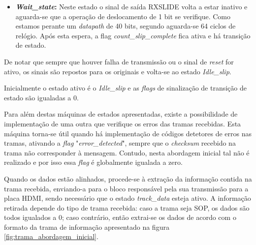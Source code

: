 \begin{enumerate}
\begin{itemize}
		\item \textbf{\textit{Wait\_state}:} Neste estado o sinal de saída RXSLIDE volta a estar inativo e aguarda-se que a operação de deslocamento de 1 bit se verifique. Como estamos perante um \textit{datapath} de 40 bits, segundo \cite{R011} aguarda-se 64 ciclos de relógio. Após esta espera, a flag \textit{count\_slip\_complete} fica ativa e há transição de estado.
	\end{itemize}
	
	De notar que sempre que houver falha de transmissão ou o sinal de \textit{reset} for ativo, os sinais são repostos para os originais e volta-se ao estado \textit{Idle\_slip}.
	
	
	Inicialmente o estado ativo é o {\textit{Idle\_slip} }e as \textit{flags} de sinalização de transição de estado são igualadas a 0.
	
\end{enumerate}

Para além destas máquinas de estados apresentadas, existe a possibilidade de implementação de uma outra que verifique os erros das tramas recebidas. Esta máquina torna-se útil quando há implementação de códigos detetores de erros nas tramas, ativando a \textit{flag}  "\textit{error\_detected}", sempre que o \textit{checksum} recebido na trama não corresponder à mensagem. Contudo, nesta abordagem inicial tal não é realizado e por isso essa \textit{flag} é globalmente igualada a zero.

Quando os dados estão alinhados, procede-se à extração da informação contida na trama recebida, enviando-a para o bloco responsável pela sua transmissão para a placa HDMI, sendo necessário que o estado  \textit{track\_data} esteja ativo. A informação retirada depende do tipo de trama recebida: caso a trama seja SOP, os dados são todos igualados a 0; caso contrário, então extrai-se os dados de acordo com o formato da trama de informação apresentado na figura \ref{fig:trama_abordagem_inicial}.


%

